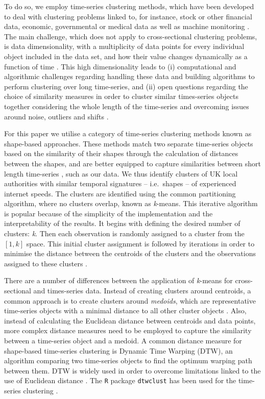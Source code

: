 \documentclass[Royal,times,sageh]{sagej}
\begin{document}
To do so, we employ time-series clustering methods, which have been
developed to deal with clustering problems linked to, for instance,
stock or other financial data, economic, governmental or medical data as
well as machine monitoring
\citep{aggarwal2013time, aggarwal2001surprising, hyndman2015large, WARRENLIAO20051857}.
The main challenge, which does not apply to cross-sectional clustering
problems, is data dimensionality, with a multiplicity of data points for
every individual object included in the data set, and how their value
changes dynamically as a function of time \citep{aghabozorgi2015time}.
This high dimensionality leads to (i) computational and algorithmic
challenges regarding handling these data and building algorithms to
perform clustering over long time-series, and (ii) open questions
regarding the choice of similarity measures in order to cluster similar
times-series objects together considering the whole length of the
time-series and overcoming issues around noise, outliers and shifts
\citep{lin2004iterative, aghabozorgi2015time}.

For this paper we utilise a category of time-series clustering methods
known as shape-based approaches. These methods match two separate
time-series objects based on the similarity of their shapes through the
calculation of distances between the shapes, and are better equipped to
capture similarities between short length time-series
\citep{aghabozorgi2015time}, such as our data. We thus identify clusters
of UK local authorities with similar temporal signatures -- i.e.~shapes
-- of experienced internet speeds. The clusters are identified using the
common partitioning algorithm, where no clusters overlap, known as
\emph{k}-means. This iterative algorithm is popular because of the
simplicity of the implementation and the interpretability of the
results. It begins with defining the desired number of clusters:
\emph{k}. Then each observation is randomly assigned to a cluster from
the \([1,k]\) space. This initial cluster assignment is followed by
iterations in order to minimise the distance between the centroids of
the clusters and the observations assigned to these clusters
\citep{james2013introduction}.

There are a number of differences between the application of
\emph{k}-means for cross-sectional and times-series data. Instead of
creating clusters around centroids, a common approach is to create
clusters around \emph{medoids}, which are representative time-series
objects with a minimal distance to all other cluster objects
\citep{sardatime}. Also, instead of calculating the Euclidean distance
between centroids and data points, more complex distance measures need
to be employed to capture the similarity between a time-series object
and a medoid. A common distance measure for shape-based time-series
clustering is Dynamic Time Warping (DTW), an algorithm comparing two
time-series objects to find the optimum warping path between them. DTW
is widely used in order to overcome limitations linked to the use of
Euclidean distance
\citep{sardatime, berndt1994using, ratanamahatana2004everything}. The
\texttt{R} package \texttt{dtwclust} has been used for the time-series
clustering \citep{dtwclust}.
\end{document}
